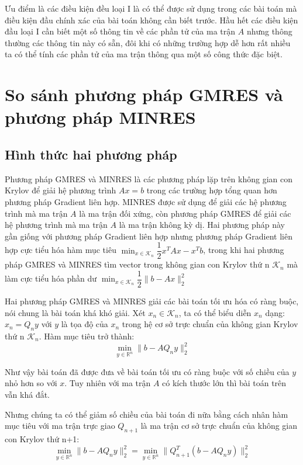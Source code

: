 \documentclass[14pt, a4paper]{article}
\numberwithin{equation}{section}
\numberwithin{algorithm}{section}
\numberwithin{figure}{section}
\numberwithin{dl}{section}
\numberwithin{md}{section}
\numberwithin{bd}{section}
\numberwithin{dn}{section}
\begin{document}
Ưu điểm là các điều kiện đều loại I là có thể được sử dụng trong các bài toán mà điều kiện đầu chính xác của bài toán không cần biết trước. Hầu hết các điều kiện đầu loại I cần biết một số thông tin về các phần tử của ma trận $A$ nhưng thông thường các thông tin này có sẵn, đôi khi có những trường hợp dễ hơn rất nhiều ta có thể tính các phần tử của ma trận thông qua một số công thức đặc biệt.

\section{So sánh phương pháp GMRES và phương pháp MINRES}

\subsection{Hình thức hai phương pháp}

Phương pháp GMRES và MINRES là các phương pháp lặp trên không gian con Krylov để giải hệ phương trình $Ax=b$ trong các trường hợp tổng quan hơn phương pháp Gradient liên hợp.
MINRES được sử dụng để giải các hệ phương trình mà ma trận $A$ là ma trận đối xứng, còn phương pháp GMRES để giải các hệ phương trình mà ma trận $A$ là ma trận không kỳ dị.
Hai phương pháp này gần giống với phương pháp Gradient liên hợp nhưng phương pháp Gradient liên hợp cực tiểu hóa hàm mục tiêu $\displaystyle \min_{x \in \mathcal{K}_n}\dfrac{1}{2}x^TAx - x^Tb$,
trong khi hai phương pháp GMRES và MINRES tìm vector trong không gian con Krylov thứ n $\displaystyle \mathcal{K}_n$ mà làm cực tiểu hóa phần dư $\displaystyle \min_{x \in \mathcal{K}_n}\dfrac{1}{2}\lVert b - Ax \rVert_2^2$

Hai phương pháp GMRES và MINRES giải các bài toán tối ưu hóa có ràng buộc, nói chung là bài toán khá khó giải. Xét $x_n \in \mathcal{K}_n$, ta có thể biểu diễn $x_n$ dạng:
$x_n = Q_n y$ với $y$ là tọa độ của $x_n$ trong hệ cơ sở trực chuẩn của không gian Krylov thứ n $\mathcal{K}_n$. Hàm mục tiêu trở thành:
\begin{equation} \min_{y \in \mathbb{R}^{n}}  \lVert b - AQ_n y \rVert_2^2\end{equation}

Như vậy bài toán đã được đưa về bài toán tối ưu có ràng buộc với số chiều của $y$ nhỏ hơn so với $x$. Tuy nhiên với ma trận $A$ có kích thước lớn thì bài toán trên vẫn khá đắt.

Nhưng chúng ta có thể giảm số chiều của bài toán đi nữa bằng cách nhân hàm mục tiêu với ma trận trực giao $Q_{n+1}$ là ma trận cơ sở trực chuẩn của không gian con Krylov thứ n+1:
\begin{equation} \min_{y \in \mathbb{R}^{n}}  \lVert b - AQ_n y \rVert_2^2 = \min_{y \in \mathbb{R}^{n}}  \lVert Q_{n+1}^T(b - AQ_n y) \rVert_2^2 \label{eq:uncons_obj}\end{equation}
\end{document}
